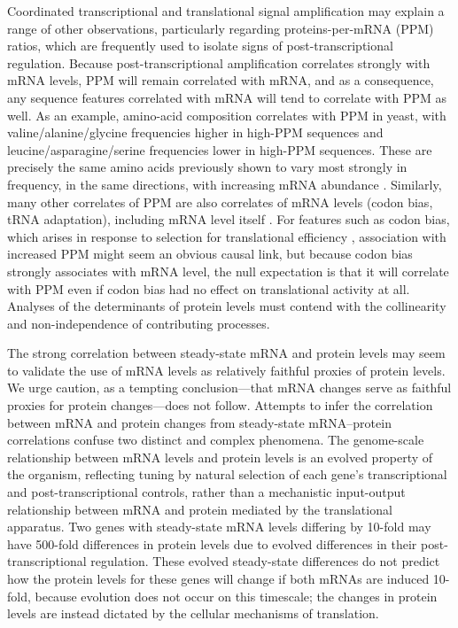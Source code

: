 \documentclass[10pt]{article}
\begin{document}
Coordinated transcriptional and translational signal amplification may explain a range of other observations, particularly regarding proteins-per-mRNA (PPM) ratios, which are frequently used to isolate signs of post-transcriptional regulation. Because post-transcriptional amplification correlates strongly with mRNA levels, PPM will remain correlated with mRNA, and as a consequence, any sequence features correlated with mRNA will tend to correlate with PPM as well. As an example, amino-acid composition correlates with PPM in yeast\cite{lu07}, with valine/alanine/glycine frequencies higher in high-PPM sequences and leucine/asparagine/serine frequencies lower in high-PPM sequences. These are precisely the same amino acids previously shown to vary most strongly in frequency, in the same directions, with increasing mRNA abundance \cite{Akashi2003}. Similarly, many other correlates of PPM are also correlates of mRNA levels (codon bias, tRNA adaptation), including mRNA level itself \cite{brockmann07, desousa09}. For features such as codon bias, which arises in response to selection for translational efficiency \cite{Wallace2013}, association with increased PPM might seem an obvious causal link, but because codon bias strongly associates with mRNA level, the null expectation is that it will correlate with PPM even if codon bias had no effect on translational activity at all. Analyses of the determinants of protein levels must contend with the collinearity and non-independence of contributing processes.

The strong correlation between steady-state mRNA and protein levels may seem
to validate the use of mRNA levels as relatively faithful proxies of protein
levels. We urge caution, as a tempting conclusion---that mRNA changes serve as
faithful proxies for protein changes---does not follow. Attempts to infer the
correlation between mRNA and protein changes from steady-state mRNA--protein correlations confuse two distinct and complex phenomena. The genome-scale relationship between mRNA levels and protein levels is an evolved
property of the organism, reflecting tuning by natural selection of each
gene's transcriptional and post-transcriptional controls, rather than a
mechanistic input-output relationship between mRNA and protein mediated by the
translational apparatus. Two genes with steady-state mRNA levels differing by
10-fold may have 500-fold differences in protein levels due to evolved
differences in their post-transcriptional regulation. These evolved steady-state differences do not
predict how the protein levels for these genes will change if both mRNAs are induced 10-fold, because evolution does not occur on this timescale; the changes in protein levels are instead dictated by the cellular mechanisms of translation.
\end{document}
